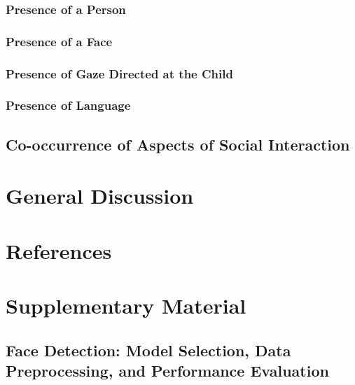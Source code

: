 \documentclass[
  man,floatsintext]{apa6}
\begin{document}
\subsubsection{Presence of a Person}\label{presence-of-a-person}

\subsubsection{Presence of a Face}\label{presence-of-a-face}

\subsubsection{Presence of Gaze Directed at the Child}\label{presence-of-gaze-directed-at-the-child}

\subsubsection{Presence of Language}\label{presence-of-language}

\subsection{Co-occurrence of Aspects of Social Interaction}\label{co-occurrence-of-aspects-of-social-interaction}

\section{General Discussion}\label{general-discussion}

\newpage

\section{References}\label{references}

\newpage

\section{Supplementary Material}\label{supplementary-material}

\subsection{Face Detection: Model Selection, Data Preprocessing, and Performance Evaluation}\label{face-detection-model-selection-data-preprocessing-and-performance-evaluation}
\end{document}
